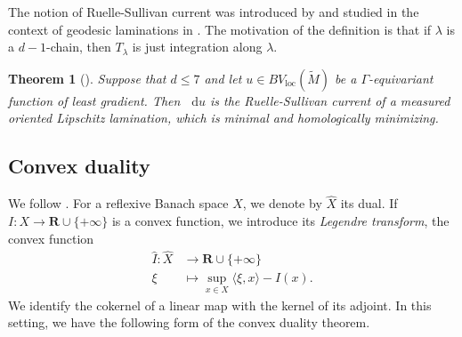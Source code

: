 \documentclass[reqno,11pt]{amsart}
\newcommand{\RR}{\mathbf{R}}
\newcommand*\dif{\mathop{}\!\mathrm{d}}
\newcommand{\dfn}[1]{\emph{#1}\index{#1}}
\newcommand{\loc}{\mathrm{loc}}
\newtheorem{theorem}{Theorem}[section]
\theoremstyle{definition}
\numberwithin{equation}{section}
\begin{document}
The notion of Ruelle-Sullivan current  was introduced by \cite{Ruelle75} and studied in the context of geodesic laminations in \cite[\S8]{daskalopoulos2020transverse}.
The motivation of the definition is that if $\lambda$ is a $d - 1$-chain, then $T_\lambda$ is just integration along $\lambda$.

\begin{theorem}[{\cite[Theorem B]{BackusCML}}]\label{1 harmonic is MOML}
Suppose that $d \leq 7$ and let $u \in BV_\loc(\tilde M)$ be a $\Gamma$-equivariant function of least gradient.
Then $\dif u$ is the Ruelle-Sullivan current of a measured oriented Lipschitz lamination, which is minimal and homologically minimizing.
\end{theorem}

\subsection{Convex duality}
We follow \cite{Ekeland99}.
For a reflexive Banach space $X$, we denote by $\hat X$ its dual.
If $I: X \to \RR \cup \{+\infty\}$ is a convex function, we introduce its \dfn{Legendre transform}, the convex function
\begin{align*}
	\hat I: \hat X &\to \RR \cup \{+\infty\}\\
	\xi &\mapsto \sup_{x \in X} \langle \xi, x\rangle - I(x).
\end{align*}
We identify the cokernel of a linear map with the kernel of its adjoint.
In this setting, we have the following form of the convex duality theorem.
\end{document}
